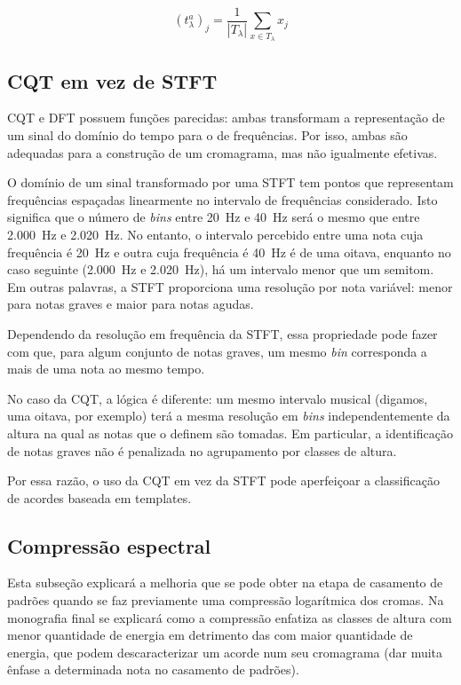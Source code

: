         \[
            (t_\lambda^a)_j = \frac{1}{|T_\lambda|} \sum_{x \in T_\lambda} x_j
        \]


    \subsection{CQT em vez de STFT}
        CQT e DFT possuem funções parecidas: ambas transformam a representação de um sinal do domínio do tempo para o de frequências. Por isso, ambas são adequadas para a construção de um cromagrama, mas não igualmente efetivas.

        O domínio de um sinal transformado por uma STFT tem pontos que representam frequências espaçadas linearmente no intervalo de frequências considerado. Isto significa que o número de \textit{bins} entre 20~Hz e 40~Hz será o mesmo que entre 2.000~Hz e 2.020~Hz. No entanto, o intervalo percebido entre uma nota cuja frequência é 20~Hz e outra cuja frequência é 40~Hz é de uma oitava, enquanto no caso seguinte (2.000~Hz e 2.020~Hz), há um intervalo menor que um semitom. Em outras palavras, a STFT proporciona uma resolução por nota variável: menor para notas graves e maior para notas agudas.

        Dependendo da resolução em frequência da STFT, essa propriedade pode fazer com que, para algum conjunto de notas graves, um mesmo \textit{bin} corresponda a mais de uma nota ao mesmo tempo.

        No caso da CQT, a lógica é diferente: um mesmo intervalo musical (digamos, uma oitava, por exemplo) terá a mesma resolução em \textit{bins} independentemente da altura na qual as notas que o definem são tomadas. Em particular, a identificação de notas graves não é penalizada no agrupamento por classes de altura.

        Por essa razão, o uso da CQT em vez da STFT pode aperfeiçoar a classificação de acordes baseada em templates.

    
    \subsection{Compressão espectral}
        Esta subseção explicará a melhoria que se pode obter na etapa de casamento de padrões quando se faz previamente uma compressão logarítmica dos cromas. Na monografia final se explicará como a compressão enfatiza as classes de altura com menor quantidade de energia em detrimento das com maior quantidade de energia, que podem descaracterizar um acorde num seu cromagrama (dar muita ênfase a determinada nota no casamento de padrões).

